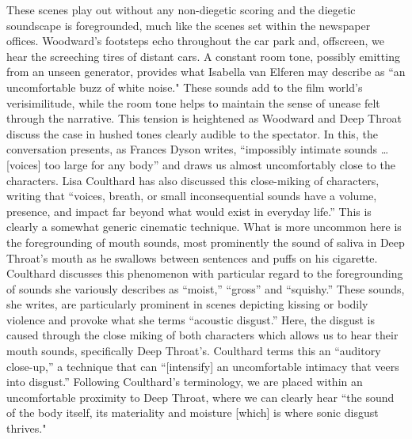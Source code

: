 These scenes play out without any non-diegetic scoring and the diegetic soundscape is foregrounded, much like the scenes set within the newspaper offices.
Woodward’s footsteps echo throughout the car park and, offscreen, we hear the screeching tires of distant cars.
A constant room tone, possibly emitting from an unseen generator, provides what Isabella van Elferen may describe as ``an uncomfortable buzz of white noise."\autocites[][180]{van_elferen_dream_2012}
These sounds add to the film world's verisimilitude, while the room tone helps to maintain the sense of unease felt through the narrative.
This tension is heightened as Woodward and Deep Throat discuss the case in hushed tones clearly audible to the spectator.
In this, the conversation presents, as Frances Dyson writes, ``impossibly intimate sounds … [voices] too large for any body” and draws us almost uncomfortably close to the characters.\autocites[][136]{dyson_sounding_2009}
Lisa Coulthard has also discussed this close-miking of characters, writing that ``voices, breath, or small inconsequential sounds have a volume, presence, and impact far beyond what would exist in everyday life.”\autocites[][184]{coulthard_acoustic_2016}
This is clearly a somewhat generic cinematic technique.
What is more uncommon here is the foregrounding of mouth sounds, most prominently the sound of saliva in Deep Throat's mouth as he swallows between sentences and puffs on his cigarette.
Coulthard discusses this phenomenon with particular regard to the foregrounding of sounds she variously describes as ``moist,” ``gross” and ``squishy.”\autocites[][185]{coulthard_acoustic_2016}
These sounds, she writes, are particularly prominent in scenes depicting kissing or bodily violence and provoke what she terms ``acoustic disgust.”\autocites[][185, 191]{coulthard_acoustic_2016}
Here, the disgust is caused through the close miking of both characters which allows us to hear their mouth sounds, specifically Deep Throat’s.
Coulthard terms this an ``auditory close-up,” a technique that can ``[intensify] an uncomfortable intimacy that veers into disgust.”\autocites[][187]{coulthard_acoustic_2016}
Following Coulthard’s terminology, we are placed within an uncomfortable proximity to Deep Throat, where we can clearly hear ``the sound of the body itself, its materiality and moisture [which] is where sonic disgust thrives."\autocites[][185]{coulthard_acoustic_2016}


